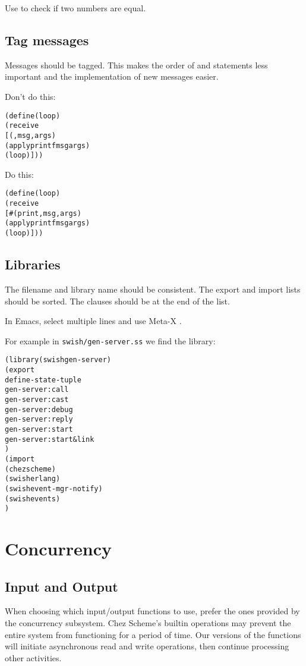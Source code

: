 \documentclass[letterpaper,11pt,twoside,final]{article}
\begin{document}
Use \code{=} to check if two numbers are equal.

\subsection* {Tag messages}

Messages should be tagged. This makes the order of 
and  statements less important and the implementation of
new messages easier.

Don't do this:
\antipar
\begin{alltt}
(define (loop)
  (receive
   [(,msg ,args)
    (apply printf msg args)
    (loop)]))
\end{alltt}

Do this:
\antipar
\begin{alltt}
(define (loop)
  (receive
   [\#(print ,msg ,args)
    (apply printf msg args)
    (loop)]))
\end{alltt}

\subsection* {Libraries}

The filename and library name should be consistent. The export and
import lists should be sorted. The  clauses should be
at the end of the  list.

In Emacs, select multiple lines and use Meta-X .

For example in \texttt{swish/gen-server.ss} we find the
 library: \antipar
\begin{alltt}
(library (swish gen-server)
  (export
   define-state-tuple
   gen-server:call
   gen-server:cast
   gen-server:debug
   gen-server:reply
   gen-server:start
   gen-server:start&link
   )
  (import
   (chezscheme)
   (swish erlang)
   (swish event-mgr-notify)
   (swish events)
   )
\end{alltt}

\section* {Concurrency}

\subsection* {Input and Output}

When choosing which input/output functions to use, prefer the ones
provided by the concurrency subsystem. Chez Scheme's builtin
operations may prevent the entire system from functioning for a period
of time. Our versions of the functions will initiate asynchronous read
and write operations, then continue processing other activities.
\end{document}
